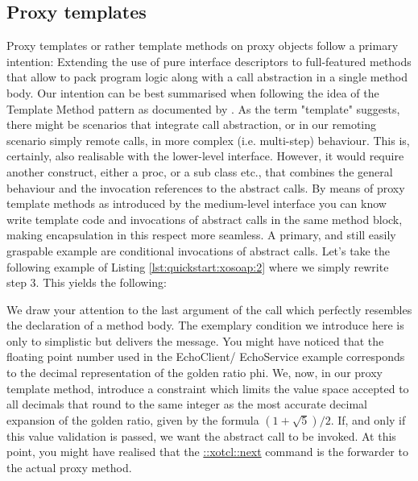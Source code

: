  \subsection{Proxy templates}\label{sec:advanced:template}
Proxy templates or rather template methods on proxy objects follow a
primary intention: Extending the use of pure interface descriptors to
full-featured methods that allow to pack program logic along with a
call abstraction in a single method body. Our intention can be best
summarised when following the idea of the Template Method pattern as
documented by \cite{gof:1994}. As the term "template" suggests, there
might be scenarios that integrate call abstraction, or in our remoting
scenario simply remote calls, in more complex (i.e. multi-step)
behaviour. This is, certainly, also realisable with the lower-level
interface.  However, it would require another construct, either a
proc, or a sub class etc., that combines the general behaviour and the
invocation references to the abstract calls. By means of proxy
template methods as introduced by the medium-level interface you can
know write template code and invocations of abstract calls in the same
method block, making encapsulation in this respect more seamless. A
primary, and still easily graspable example are conditional
invocations of abstract calls. Let's take the following example of
Listing \ref{lst:quickstart:xosoap:2} where we simply rewrite step
3. This yields the following:
\lstset{breaklines=true,numbers=left,basicstyle=\footnotesize,frame=single,tabsize=2}
%


We draw your attention to the last argument of the
 call which
perfectly resembles the declaration of a method body. The exemplary
condition we introduce here is only to simplistic but delivers the
message. You might have noticed that the floating point number used in
the EchoClient/ EchoService example corresponds to the decimal
representation of the golden ratio phi. We, now, in our proxy template
method, introduce a constraint which limits the value space accepted
to all decimals that round to the same integer as the most accurate
decimal expansion of the golden ratio, given by the
formula \begin{math} (1 + \sqrt{5}) / 2\end{math}. If, and only if
this value validation is passed, we want the abstract call to be
invoked. At this point, you might have realised that the
\href{http://media.wu-wien.ac.at/doc/tutorial.html#class_method_chaining}{::xotcl::next}
command is the forwarder to the actual proxy method.

